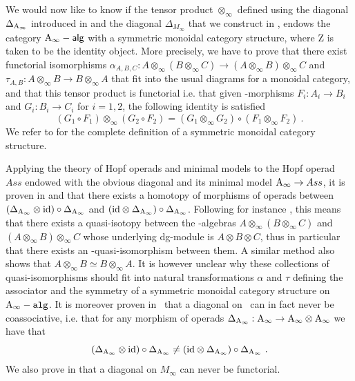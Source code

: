\documentclass[twoside, 12pt]{amsart}
\theoremstyle{remark}
\begin{document}

We would now like to know if the tensor product $\otimes_\infty$ defined using the diagonal $\Delta_{\mathrm{A}_\infty}$ introduced in \cite{markl-assoc} and the diagonal $\Delta_{M_\infty}$ that we construct in \cite{masuda-diagonal-multipl}, endows the category $\mathsf{\mathrm{A}_\infty -alg}$ with a symmetric monoidal category structure, where $\mathrm{Z}$ is taken to be the identity object. More precisely, we have to prove that there exist functorial isomorphisms $\alpha_{A,B,C} : A \otimes_\infty ( B \otimes_\infty C) \rightarrow (A \otimes_\infty B) \otimes_\infty C$ and $\tau_{A,B} : A \otimes_\infty B \rightarrow B \otimes_\infty A$ that fit into the usual diagrams for a monoidal category, and that this tensor product is functorial i.e. that given \Ainf -morphisms $F_i : A_i \rightarrow B_i$ and $G_i : B_i \rightarrow C_i$ for $i=1,2$, the following identity is satisfied 
\[ (G_1 \circ F_1) \otimes_\infty (G_2 \circ F_2) = (G_1 \otimes_\infty G_2) \circ (F_1 \otimes_\infty F_2) \ . \]
We refer to \cite{MacLane98} for the complete definition of a symmetric monoidal category structure.

Applying the theory of Hopf operads and minimal models to the Hopf operad $Ass$ endowed with the obvious diagonal and its minimal model $\mathrm{A}_\infty \rightarrow Ass$, it is proven in \cite{markl-shnider-stasheff} and \cite{markl-assoc} that there exists a homotopy of morphisms of operads between $(\Delta_{\mathrm{A}_\infty} \otimes \mathrm{id}) \circ \Delta_{\mathrm{A}_\infty}$ and $(\mathrm{id} \otimes \Delta_{\mathrm{A}_\infty} ) \circ \Delta_{\mathrm{A}_\infty}$. Following for instance \cite{fukaya-cyclic-symmetry}, this means that there exists a quasi-isotopy between the \Ainf -algebras $A \otimes_\infty ( B \otimes_\infty C)$ and $(A \otimes_\infty B) \otimes_\infty C$ whose underlying dg-module is $A \otimes B \otimes C$, thus in particular that there exists an \Ainf -quasi-isomorphism between them.  A similar method also shows that $A \otimes_\infty B \simeq B \otimes_\infty A$.
It is however unclear why these collections of quasi-isomorphisms should fit into natural transformations $\alpha$ and $\tau$ defining the associator and the symmetry of a symmetric monoidal category structure on $\mathtt{\mathrm{A}_\infty -alg}$. 
It is moreover proven in~\cite{markl-assoc} that a diagonal on \Ainf\ can in fact never be coassociative, i.e. that for any morphism of operads $\Delta_{\mathrm{A}_\infty} : \mathrm{A}_\infty \rightarrow \mathrm{A}_\infty \otimes \mathrm{A}_\infty$ we have that \[ (\Delta_{\mathrm{A}_\infty} \otimes \mathrm{id}) \circ \Delta_{\mathrm{A}_\infty} \neq (\mathrm{id} \otimes \Delta_{\mathrm{A}_\infty} ) \circ \Delta_{\mathrm{A}_\infty} \ . \]
We also prove in \cite{masuda-diagonal-multipl} that a diagonal on $M_\infty$ can never be functorial.
\end{document}

